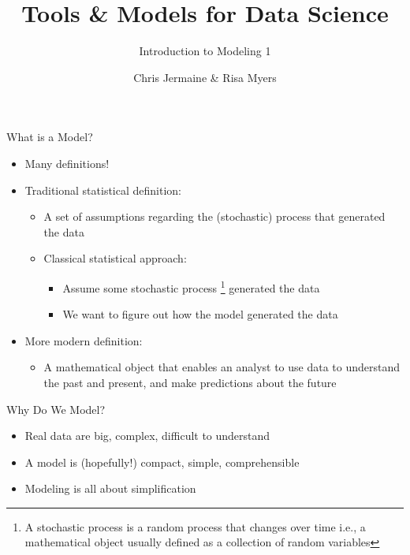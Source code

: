 \documentclass[aspectratio=169]{beamer}
\title[]
{Tools \& Models for Data Science}
\subtitle{Introduction to Modeling 1}
\author[]{Chris Jermaine \& Risa Myers}
\institute
{
  Rice University 
}
\date[]{}
\begin{document}
\begin{frame}
 \titlepage
\end{frame}

\begin{frame}{What is a Model?}

\begin{itemize}
\item Many definitions!
\item Traditional statistical definition:
	\begin{itemize}
	\item A set of assumptions regarding the (stochastic) process that generated the data
	\item Classical statistical approach: 
		\begin{itemize}
		\item Assume some stochastic process \footnote {  A stochastic process is a random process that changes over time i.e., a mathematical object usually defined as a collection of random variables
} generated the data
		\item We want to figure out how the model generated the data
		\end{itemize}
	\end{itemize}
\item More modern definition:
	\begin{itemize}
	\item A mathematical object that enables an analyst to use data to understand the past and present,
	and make predictions about the future
	\end{itemize}
\end{itemize}
\end{frame}
\begin{frame}{Why Do We Model?}

\begin{itemize}
\item Real data are big, complex, difficult to understand
\item A model is (hopefully!) compact, simple, comprehensible
\item Modeling is all about simplification
\end{itemize}
\end{frame}
\end{document}
